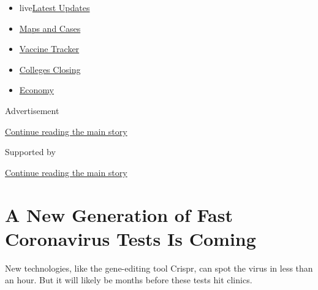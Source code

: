 \begin{itemize}
\tightlist
\item
  live\href{https://www.nytimes3xbfgragh.onion/2020/08/20/world/coronavirus-covid.html?name=styln-coronavirus-national\&region=TOP_BANNER\&variant=undefined\&block=storyline_menu_recirc\&action=click\&pgtype=Article\&impression_id=5e38bc71-e38a-11ea-9e4d-7f40ba2d7eff}{Latest
  Updates}
\item
  \href{https://www.nytimes3xbfgragh.onion/interactive/2020/us/coronavirus-us-cases.html?name=styln-coronavirus-national\&region=TOP_BANNER\&variant=undefined\&block=storyline_menu_recirc\&action=click\&pgtype=Article\&impression_id=5e38bc72-e38a-11ea-9e4d-7f40ba2d7eff}{Maps
  and Cases}
\item
  \href{https://www.nytimes3xbfgragh.onion/interactive/2020/science/coronavirus-vaccine-tracker.html?name=styln-coronavirus-national\&region=TOP_BANNER\&variant=undefined\&block=storyline_menu_recirc\&action=click\&pgtype=Article\&impression_id=5e38bc73-e38a-11ea-9e4d-7f40ba2d7eff}{Vaccine
  Tracker}
\item
  \href{https://www.nytimes3xbfgragh.onion/2020/08/19/us/colleges-closing-covid.html?name=styln-coronavirus-national\&region=TOP_BANNER\&variant=undefined\&block=storyline_menu_recirc\&action=click\&pgtype=Article\&impression_id=5e38bc74-e38a-11ea-9e4d-7f40ba2d7eff}{Colleges
  Closing}
\item
  \href{https://www.nytimes3xbfgragh.onion/live/2020/08/20/business/stock-market-today-coronavirus?name=styln-coronavirus-national\&region=TOP_BANNER\&variant=undefined\&block=storyline_menu_recirc\&action=click\&pgtype=Article\&impression_id=5e38bc75-e38a-11ea-9e4d-7f40ba2d7eff}{Economy}
\end{itemize}

Advertisement

\protect\hyperlink{after-top}{Continue reading the main story}

Supported by

\protect\hyperlink{after-sponsor}{Continue reading the main story}

\hypertarget{a-new-generation-of-fast-coronavirus-tests-is-coming}{%
\section{A New Generation of Fast Coronavirus Tests Is
Coming}\label{a-new-generation-of-fast-coronavirus-tests-is-coming}}

New technologies, like the gene-editing tool Crispr, can spot the virus
in less than an hour. But it will likely be months before these tests
hit clinics.


